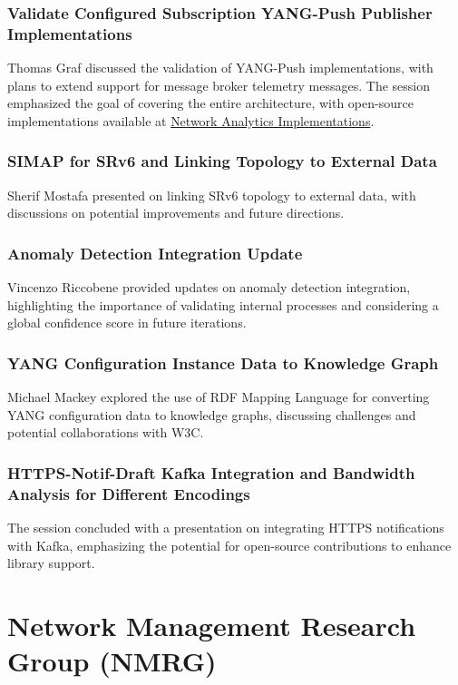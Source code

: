 \documentclass{article}
\begin{document}
\subsubsection{Validate Configured Subscription YANG-Push Publisher Implementations}
Thomas Graf discussed the validation of YANG-Push implementations, with plans to extend support for message broker telemetry messages. The session emphasized the goal of covering the entire architecture, with open-source implementations available at \href{https://www.network-analytics.org/yp/implementations.html}{Network Analytics Implementations}.

\subsubsection{SIMAP for SRv6 and Linking Topology to External Data}
Sherif Mostafa presented on linking SRv6 topology to external data, with discussions on potential improvements and future directions.

\subsubsection{Anomaly Detection Integration Update}
Vincenzo Riccobene provided updates on anomaly detection integration, highlighting the importance of validating internal processes and considering a global confidence score in future iterations.

\subsubsection{YANG Configuration Instance Data to Knowledge Graph}
Michael Mackey explored the use of RDF Mapping Language for converting YANG configuration data to knowledge graphs, discussing challenges and potential collaborations with W3C.

\subsubsection{HTTPS-Notif-Draft Kafka Integration and Bandwidth Analysis for Different Encodings}
The session concluded with a presentation on integrating HTTPS notifications with Kafka, emphasizing the potential for open-source contributions to enhance library support.




\newpage

\section{Network Management Research Group (NMRG)}
\end{document}
